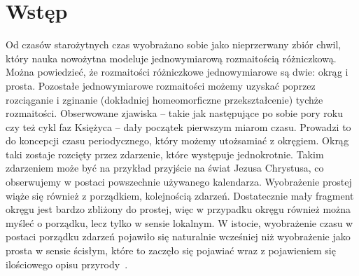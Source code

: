 \newpage
\section{Wstęp}
Od czasów starożytnych czas wyobrażano sobie jako nieprzerwany zbiór chwil, 
który nauka nowożytna modeluje jednowymiarową rozmaitością różniczkową.
Można powiedzieć, że rozmaitości różniczkowe 
 jednowymiarowe są dwie: okrąg i prosta. 
Pozostałe jednowymiarowe rozmaitości możemy uzyskać 
poprzez rozciąganie i zginanie 
(dokładniej homeomorficzne przekształcenie) 
tychże rozmaitości.
Obserwowane zjawiska -- takie jak 
następujące po sobie pory roku czy też cykl faz 
Księżyca -- dały początek pierwszym miarom czasu. 
Prowadzi to do koncepcji czasu periodycznego, który możemy 
utożsamiać z okręgiem. 
Okrąg taki zostaje rozcięty przez zdarzenie, które występuje 
jednokrotnie. Takim zdarzeniem może być na przykład 
przyjście na świat Jezusa Chrystusa, co 
obserwujemy w postaci powszechnie 
używanego kalendarza. 
Wyobrażenie prostej wiąże się również z porządkiem, 
kolejnością zdarzeń. 
Dostatecznie mały fragment okręgu jest bardzo zbliżony do
prostej, więc w przypadku okręgu również można myśleć o
 porządku, lecz tylko w sensie lokalnym. 
W istocie, wyobrażenie czasu w postaci porządku zdarzeń
pojawiło się naturalnie wcześniej niż wyobrażenie jako prosta 
w sensie ścisłym, które to zaczęło się pojawiać wraz 
z pojawieniem się ilościowego opisu przyrody~\cite{czasHeller}.


